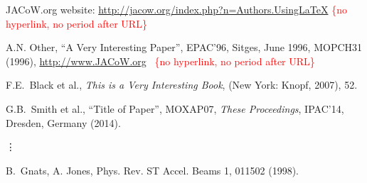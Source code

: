 \documentclass[a4paper,
              ]{jacow}
\begin{document}
\iffalse  %
	\newpage
	\printbibliography

\else

\begin{thebibliography}{99} %


	JACoW.org website:
	\url{http://jacow.org/index.php?n=Authors.UsingLaTeX}%
	\hfill\textcolor{red}{\{no hyperlink, no period after URL\}}

	A.N. Other,
	``A Very Interesting Paper'',
	EPAC'96, Sitges, June 1996, MOPCH31 (1996),
	\url{http://www.JACoW.org}\newline \mbox{ } \hfill\textcolor{red}{\{no hyperlink, no period after URL\}}
	

	F.E.~Black et al.,
	\textit{This is a Very Interesting Book},
	(New York: Knopf, 2007), 52.
 
    G.B.~Smith et al., ``Title of Paper'',
    MOXAP07, \textit{These Proceedings}, IPAC'14, Dresden, 
    Germany (2014).

	\hspace*{-1.1em}\mbox{\vdots}

\addtocounter{enumi}{5}
	B.~Gnats, A. Jones,
	Phys. Rev. ST Accel. Beams 1, 011502 (1998).

\end{thebibliography}

\fi
\end{document}
